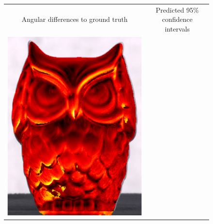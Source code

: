 \begin{figure}[t]
    \centering
    \newcommand{\customwidthres}{0.45\linewidth}
    \begin{tabular}{cc}
        \scriptsize Angular differences to ground truth & \scriptsize Predicted 95\% confidence intervals \\
        \includegraphics[width=\customwidthres]{./figures/reconstruction/owl_delta_gt.png} &

\end{tabular}
\end{figure}
